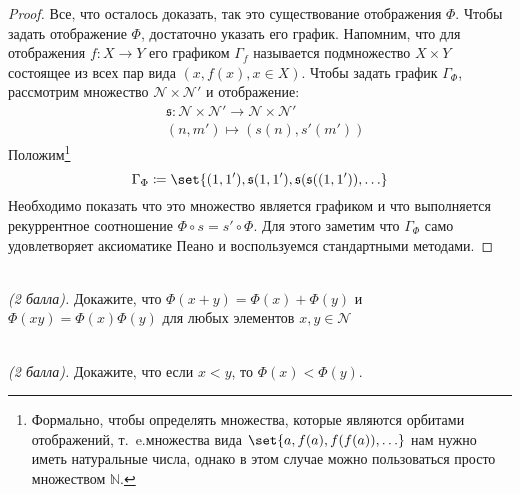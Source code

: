 \documentclass{article}
\newcommand{\ie}{т{.}~e{.}}
\begin{document}
\begin{proof}
    Все, что осталось доказать, так это существование отображения \(\Phi\). Чтобы задать отображение \(\Phi\), достаточно указать его график. Напомним, что для отображения \(f \colon X \to Y\) его графиком \(\Gamma_f\) называется подмножество \(X \times Y\) состоящее из всех пар вида \((x, f(x), x \in X)\). Чтобы задать график \(\Gamma_{\Phi}\), рассмотрим множество \(\mathcal{N} \times \mathcal{N}'\) и отображение:
    \begin{align*}
        & \mathfrak{s} \colon \mathcal{N} \times \mathcal{N}' \to \mathcal{N} \times \mathcal{N}' \\
        & (n, m') \mapsto (s(n), s'(m'))
    \end{align*}
    Положим\footnote{Формально, чтобы определять множества, которые являются орбитами отображений, \ie множества вида \(\set{a, f(a), f(f(a)), \ldots}\) нам нужно иметь натуральные числа, однако в этом случае можно пользоваться просто множеством \(\mathbb{N}\).}
    \[
        \Gamma_{\Phi} \coloneqq \set{(1, 1'), \mathfrak{s}(1, 1'), \mathfrak{s}(\mathfrak{s}((1, 1')), \ldots}
    \]
    Необходимо показать что это множество является графиком и что выполняется рекуррентное соотношение \(\Phi \circ s = s' \circ \Phi\). Для этого заметим что \(\Gamma_{\Phi}\) само удовлетворяет аксиоматике Пеано и воспользуемся стандартными методами.
\end{proof}
\begin{?}\ \\
    \textit{(2 балла).} Докажите, что \(\Phi(x + y) = \Phi(x) + \Phi(y)\) и \(\Phi(xy) = \Phi(x) \Phi(y)\) для любых элементов \(x, y \in \mathcal{N}\)
\end{?}
\begin{?}\ \\
    \textit{(2 балла).} Докажите, что если \(x < y\), то \(\Phi(x) < \Phi(y)\).
\end{?}
\end{document}
